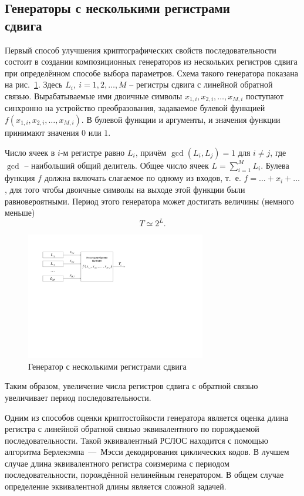 \subsection[Генераторы с несколькими регистрами сдвига]{Генераторы с несколькими регистрами \protect\\ сдвига}

Первый способ улучшения криптографических свойств последовательности состоит в создании композиционных генераторов из нескольких регистров сдвига при определённом способе выбора параметров. Схема такого генератора показана на рис.~\ref{fig:generators}. Здесь $L_i, ~ i = 1, 2, \dots, M$ -- регистры сдвига с линейной обратной связью. Вырабатываемые ими двоичные символы $x_{1,i}, x_{2,i}, \dots, x_{M,i}$ поступают синхронно на устройство преобразования, задаваемое булевой функцией $f(x_{1,i}, x_{2,i}, \dots, x_{M,i})$. В булевой функции и аргументы, и значения функции принимают значения $0$ или $1$.

Число ячеек в $i$-м регистре равно $L_{i}$, причём $\gcd(L_i, L_j)=1$ для $i \neq j$, где $\gcd$ -- наибольший общий делитель. Общее число ячеек $L = \sum\limits_{i=1}^M L_i$. Булева функция $f$ должна включать слагаемое по одному из входов, т.~е. $f = \dots + x_i + \dots$, для того чтобы двоичные символы на выходе этой функции были равновероятными. Период этого генератора может достигать величины (немного меньше)
    \[ T \simeq 2^L. \]

\begin{figure}[!ht]
	\centering
	\includegraphics[width=0.7\textwidth]{pic/generators}
    \caption{Генератор с несколькими регистрами сдвига\label{fig:generators}}
\end{figure}

Таким образом, увеличение числа регистров сдвига с обратной связью увеличивает период последовательности.

Одним из способов оценки криптостойкости генератора является оценка длина регистра с линейной обратной связью эквивалентного по порождаемой последовательности. Такой эквивалентный РСЛОС находится с помощью алгоритма Берлекэмпа~---~Мэсси декодирования циклических кодов. В лучшем случае длина эквивалентного регистра соизмерима с периодом последовательности, порождённой нелинейным генератором. В общем случае определение эквивалентной длины является сложной задачей.